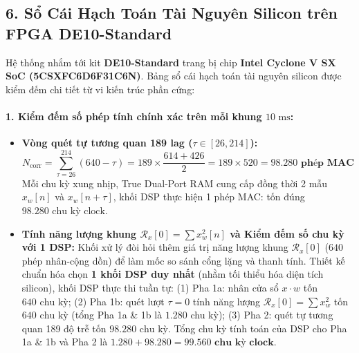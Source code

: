 \documentclass[11pt,a4paper]{article}
\begin{document}
\subsection*{6. Sổ Cái Hạch Toán Tài Nguyên Silicon trên FPGA DE10-Standard}

Hệ thống nhắm tới kit \textbf{DE10-Standard} trang bị chip \textbf{Intel Cyclone V SX SoC (5CSXFC6D6F31C6N)}. Bảng sổ cái hạch toán tài nguyên silicon được kiểm đếm chi tiết từ vi kiến trúc phần cứng:

\paragraph{1. Kiểm đếm số phép tính chính xác trên mỗi khung $10\text{ ms}$:}
\begin{itemize}
    \setlength{\itemsep}{1pt}
    \item \textbf{Vòng quét tự tương quan 189 lag ($\tau \in [26, 214]$):}
    \begin{equation}
    N_{\text{corr}} = \sum_{\tau=26}^{214} (640 - \tau) = 189 \times \frac{614 + 426}{2} = 189 \times 520 = \mathbf{98.280\text{ phép MAC}}
    \end{equation}
    Mỗi chu kỳ xung nhịp, True Dual-Port RAM cung cấp đồng thời 2 mẫu $x_w[n]$ và $x_w[n+\tau]$, khối DSP thực hiện 1 phép MAC: tốn đúng $98.280\text{ chu kỳ clock}$.
    \item \textbf{Tính năng lượng khung $\mathcal{R}_x[0] = \sum x_w^2[n]$ và Kiểm đếm số chu kỳ với 1 DSP:}
    Khối xử lý đòi hỏi thêm giá trị năng lượng khung $\mathcal{R}_x[0]$ ($640$ phép nhân-cộng dồn) để làm mốc so sánh cổng lặng và thanh tính. Thiết kế chuẩn hóa chọn \textbf{1 khối DSP duy nhất} (nhằm tối thiểu hóa diện tích silicon), khối DSP thực thi tuần tự: (1) Pha 1a: nhân cửa sổ $x \cdot w$ tốn $640\text{ chu kỳ}$; (2) Pha 1b: quét lượt $\tau = 0$ tính năng lượng $\mathcal{R}_x[0] = \sum x_w^2$ tốn $640\text{ chu kỳ}$ (tổng Pha 1a \& 1b là $1.280$ chu kỳ); (3) Pha 2: quét tự tương quan 189 độ trễ tốn $98.280\text{ chu kỳ}$. Tổng chu kỳ tính toán của DSP cho Pha 1a \& 1b và Pha 2 là $1.280 + 98.280 = \mathbf{99.560\text{ chu kỳ clock}}$.
    

\end{itemize}
\end{document}
